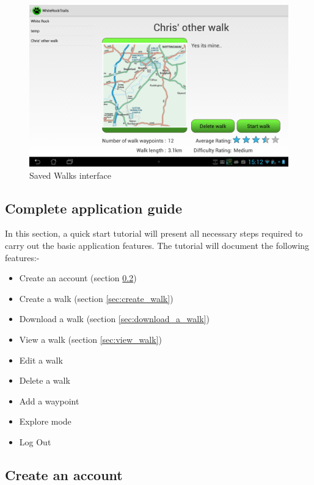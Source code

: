 \documentclass[11pt,a4paper]{report}
\begin{document}
\begin{figure}[H]
\centering
\includegraphics[width=0.8\linewidth]{./img/chris/saved_walks}
\caption{Saved Walks interface}
\label{fig:saved_walks}
\end{figure}

\subsection{Complete application guide}
\label{sec:app_complete_guide}

In this section, a quick start tutorial will present all necessary steps required to carry out the basic application features. The tutorial will document the following features:-

 \begin{itemize}
   \item Create an account (section \ref{sec:create_account})
   \item Create a walk (section \ref{sec:create_walk})
   \item Download a walk (section \ref{sec:download_a_walk})
   \item View a walk (section \ref{sec:view_walk})
   \item Edit a walk
   \item Delete a walk
   \item Add a waypoint
   \item Explore mode
   \item Log Out
   
 \end{itemize}
 
\subsection{Create an account}
\label{sec:create_account}
\end{document}

